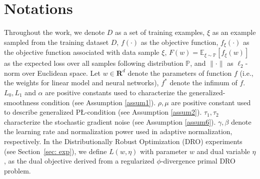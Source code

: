 \documentclass[10pt]{article} %
\begin{document}
\section{Notations}
Throughout the work, we denote $D$ as a set of training examples, $\xi$ as an example sampled from the training dataset $D$, $f(\cdot)$ as the objective function, $f_{\xi}(\cdot)$ as the objective function associated with data sample $\xi$, $F(w)=\mathbb{E}_{\xi\sim \mathbb{P}}[f_{\xi}(w)]$ as the expected loss over all samples following distribution $\mathbb{P}$, and $\|\cdot\|$ as $\ell_2$-norm over Euclidean space.  Let $w\in \mathbf{R}^d$ denote the parameters of function $f$ (i.e., the weights for linear model and neural networks), $f^*$ denote the infimum of $f$. $L_0, L_1$ and $\alpha$ are positive constants used to characterize the generalized-smoothness condition (see Assumption \ref{assum1}). $\rho, \mu$ are positive constant used to describe generalized P{\L}-condition (see Assumption \ref{assum2}). $\tau_1,\tau_2$ characterize the stochastic gradient noise (see Assumption \ref{assum6}).  $\gamma, \beta$ denote the learning rate and normalization power used in adaptive normalization, respectively. In the Distributionally Robust Optimization (DRO) experiments (see Section~\ref{sec: exp}), we define $L(w, \eta)$ with parameter $w$ and dual variable $\eta$, as the dual objective derived from a regularized $\phi$-divergence primal DRO problem.
\end{document}
